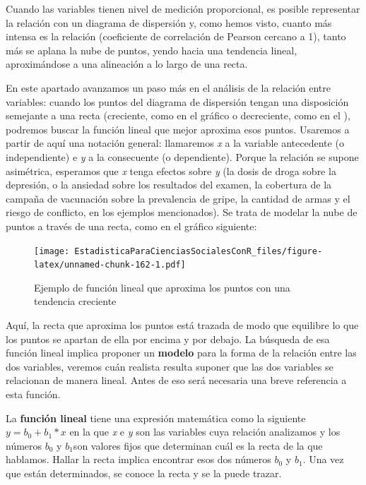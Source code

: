 \documentclass[]{book}
\begin{document}
Cuando las variables tienen nivel de medición proporcional, es posible
representar la relación con un diagrama de dispersión y, como hemos
visto, cuanto más intensa es la relación (coeficiente de correlación de Pearson cercano a 1), tanto más se aplana la nube de puntos, yendo hacia una tendencia lineal, aproximándose a una alineación a lo largo de una recta.

En este apartado avanzamos un paso más en el análisis de la relación
entre variables: cuando los puntos del diagrama de dispersión tengan una
disposición semejante a una recta (creciente, como en el gráfico o
decreciente, como en el ), podremos buscar la función lineal que mejor
aproxima esos puntos. Usaremos a partir de aquí una notación general:
llamaremos \emph{x} a la variable antecedente (o independiente) e \emph{y} a la
consecuente (o dependiente). Porque la relación se supone asimétrica,
esperamos que \emph{x} tenga efectos sobre \emph{y} (la dosis de droga sobre la
depresión, o la ansiedad sobre los resultados del examen, la cobertura de la campaña de vacunación sobre la prevalencia de gripe, la cantidad de armas y el riesgo de conflicto, en los ejemplos mencionados). Se trata de modelar la nube de puntos a través de
una recta, como en el gráfico siguiente:

\begin{figure}
\centering
\texttt{[image: EstadisticaParaCienciasSocialesConR\_files/figure-latex/unnamed-chunk-162-1.pdf]}
\caption{\label{fig:unnamed-chunk-162}Ejemplo de función lineal que aproxima los puntos con una tendencia creciente}
\end{figure}

Aquí, la recta que aproxima los puntos está trazada de modo que
equilibre lo que los puntos se apartan de ella por encima y por debajo.
La búsqueda de esa función lineal implica proponer un \textbf{modelo} para la
forma de la relación entre las dos variables, veremos cuán realista
resulta suponer que las dos variables se relacionan de manera lineal.
Antes de eso será necesaria una breve referencia a esta función.

La \textbf{función lineal} tiene una expresión matemática como la siguiente
\(y = b_{0} + b_{1}*x\) en la que \emph{x} e \emph{y} son las variables cuya
relación analizamos y los números \(b_{0}\) y \(b_{1}\)son valores fijos que
determinan cuál es la recta de la que hablamos. Hallar la recta implica
encontrar esos dos números \(b_{0}\) y \(b_{1}\). Una vez que están
determinados, se conoce la recta y se la puede trazar.
\end{document}
